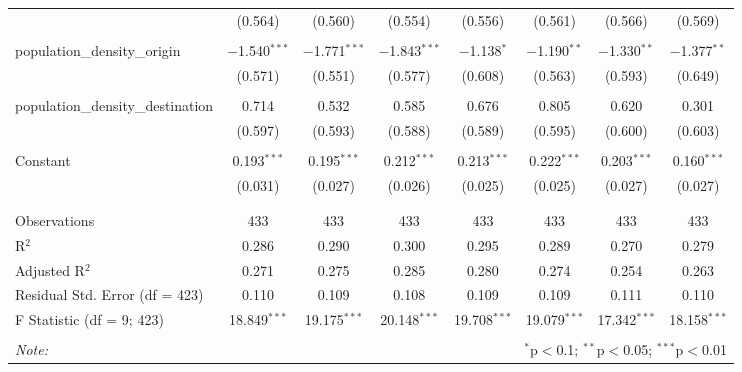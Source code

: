 \begin{table}[!htbp]
\begin{tabular}{@{\extracolsep{5pt}}lccccccc}
  & (0.564) & (0.560) & (0.554) & (0.556) & (0.561) & (0.566) & (0.569) \\ 
  & & & & & & & \\ 
 population\_density\_origin & $-$1.540$^{***}$ & $-$1.771$^{***}$ & $-$1.843$^{***}$ & $-$1.138$^{*}$ & $-$1.190$^{**}$ & $-$1.330$^{**}$ & $-$1.377$^{**}$ \\ 
  & (0.571) & (0.551) & (0.577) & (0.608) & (0.563) & (0.593) & (0.649) \\ 
  & & & & & & & \\ 
 population\_density\_destination & 0.714 & 0.532 & 0.585 & 0.676 & 0.805 & 0.620 & 0.301 \\ 
  & (0.597) & (0.593) & (0.588) & (0.589) & (0.595) & (0.600) & (0.603) \\ 
  & & & & & & & \\ 
 Constant & 0.193$^{***}$ & 0.195$^{***}$ & 0.212$^{***}$ & 0.213$^{***}$ & 0.222$^{***}$ & 0.203$^{***}$ & 0.160$^{***}$ \\ 
  & (0.031) & (0.027) & (0.026) & (0.025) & (0.025) & (0.027) & (0.027) \\ 
  & & & & & & & \\ 
\hline \\[-1.8ex] 
Observations & 433 & 433 & 433 & 433 & 433 & 433 & 433 \\ 
R$^{2}$ & 0.286 & 0.290 & 0.300 & 0.295 & 0.289 & 0.270 & 0.279 \\ 
Adjusted R$^{2}$ & 0.271 & 0.275 & 0.285 & 0.280 & 0.274 & 0.254 & 0.263 \\ 
Residual Std. Error (df = 423) & 0.110 & 0.109 & 0.108 & 0.109 & 0.109 & 0.111 & 0.110 \\ 
F Statistic (df = 9; 423) & 18.849$^{***}$ & 19.175$^{***}$ & 20.148$^{***}$ & 19.708$^{***}$ & 19.079$^{***}$ & 17.342$^{***}$ & 18.158$^{***}$ \\ 
\hline 
\hline \\[-1.8ex] 
\textit{Note:}  & \multicolumn{7}{r}{$^{*}$p$<$0.1; $^{**}$p$<$0.05; $^{***}$p$<$0.01} \\ 
\end{tabular} 
\end{table} 
